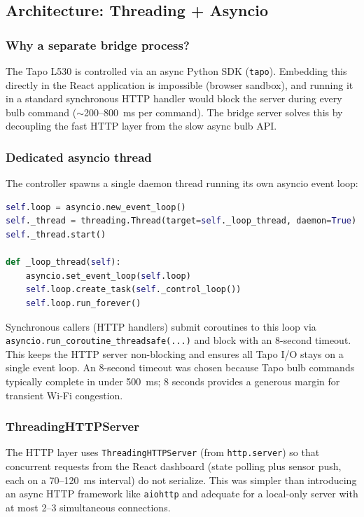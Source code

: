 \documentclass[12pt,letterpaper]{article}
\begin{document}
\subsection{Architecture: Threading + Asyncio}

\subsubsection{Why a separate bridge process?}

The Tapo L530 is controlled via an async Python SDK (\texttt{tapo}). Embedding
this directly in the React application is impossible (browser sandbox), and
running it in a standard synchronous HTTP handler would block the server during
every bulb command ($\sim$200--800~ms per command). The bridge server solves
this by decoupling the fast HTTP layer from the slow async bulb API.

\subsubsection{Dedicated asyncio thread}

The controller spawns a single daemon thread running its own asyncio event loop:

\begin{lstlisting}[language=Python, caption={Asyncio loop in dedicated thread}]
self.loop = asyncio.new_event_loop()
self._thread = threading.Thread(target=self._loop_thread, daemon=True)
self._thread.start()

def _loop_thread(self):
    asyncio.set_event_loop(self.loop)
    self.loop.create_task(self._control_loop())
    self.loop.run_forever()
\end{lstlisting}

Synchronous callers (HTTP handlers) submit coroutines to this loop via
\texttt{asyncio.run\_coroutine\_threadsafe(...)} and block with an 8-second
timeout. This keeps the HTTP server non-blocking and ensures all Tapo I/O
stays on a single event loop. An 8-second timeout was chosen because Tapo
bulb commands typically complete in under 500~ms; 8 seconds provides a
generous margin for transient Wi-Fi congestion.

\subsubsection{ThreadingHTTPServer}

The HTTP layer uses \texttt{ThreadingHTTPServer} (from \texttt{http.server})
so that concurrent requests from the React dashboard (state polling plus sensor
push, each on a 70--120~ms interval) do not serialize. This was simpler than
introducing an async HTTP framework like \texttt{aiohttp} and adequate for a
local-only server with at most 2--3 simultaneous connections.
\end{document}

